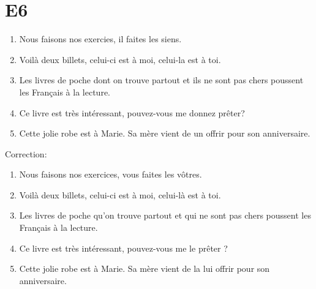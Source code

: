 \documentclass{book}
\begin{document}
    \section{E6}
        \begin{enumerate}
            \item Nous faisons nos exercies, il faites les siens.
            \item Voilà deux billets, celui-ci est à moi, celui-la est à toi.
            \item Les livres de poche dont on trouve partout et ils ne sont pas chers poussent les Français à la lecture.
            \item Ce livre est très intéressant, pouvez-vous me donnez prêter?
            \item Cette jolie robe est à Marie. Sa mère vient de un offrir pour son anniversaire.
        \end{enumerate}
        Correction:
        \begin{enumerate}
            \item Nous faisons nos exercices, vous faites les vôtres.
            \item Voilà deux billets, celui-ci est à moi, celui-là est à toi.
            \item Les livres de poche qu'on trouve partout et qui ne sont pas chers poussent les Français à la lecture.
            \item Ce livre est très intéressant, pouvez-vous me le prêter ?
            \item Cette jolie robe est à Marie. Sa mère vient de la lui offrir pour son anniversaire.
        \end{enumerate}
\end{document}
